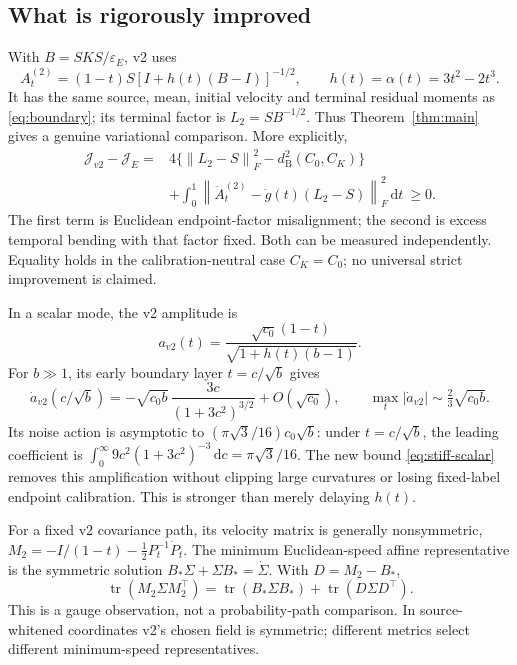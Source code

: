\documentclass[11pt,letterpaper]{article}
\newcommand{\epsE}{\varepsilon_E}
\newcommand{\tr}{\operatorname{tr}}
\newcommand{\dd}{\,\mathrm d}
\newcommand{\norm}[1]{\left\lVert#1\right\rVert}
\newcommand{\bures}{d_{\mathrm B}}
\newcommand{\J}{\mathcal J}
\begin{document}
\subsection{What is rigorously improved}
With $B=SKS/\epsE$, v2 uses
\begin{equation}
A_t^{(2)}=(1-t)S[I+h(t)(B-I)]^{-1/2},\qquad
h(t)=\alpha(t)=3t^2-2t^3.
\label{eq:v2}
\end{equation}
It has the same source, mean, initial velocity and terminal residual moments as \eqref{eq:boundary}; its terminal factor is $L_2=SB^{-1/2}$. Thus Theorem~\ref{thm:main} gives a genuine variational comparison. More explicitly,
\begin{equation}
\begin{split}
\J_{v2}-\J_E
={}&4\{\norm{L_2-S}_F^2-\bures^2(C_0,C_K)\}\\
&+\int_0^1\norm{\ddot A_t^{(2)}-\ddot g(t)(L_2-S)}_F^2\dd t\ \geq0.
\end{split}
\label{eq:v2-gap}
\end{equation}
The first term is Euclidean endpoint-factor misalignment; the second is excess temporal bending with that factor fixed. Both can be measured independently. Equality holds in the calibration-neutral case $C_K=C_0$; no universal strict improvement is claimed.

In a scalar mode, the v2 amplitude is
\begin{equation}
a_{v2}(t)=\frac{\sqrt{c_0}(1-t)}{\sqrt{1+h(t)(b-1)}}.
\end{equation}
For $b\gg1$, its early boundary layer $t=c/\sqrt b$ gives
\begin{equation}
\dot a_{v2}(c/\sqrt b)
=-\sqrt{c_0b}\,\frac{3c}{(1+3c^2)^{3/2}}+O(\sqrt{c_0}),\qquad
\max_t|\dot a_{v2}|\sim\tfrac23\sqrt{c_0b}.
\label{eq:v2-amplification}
\end{equation}
Its noise action is asymptotic to $(\pi\sqrt3/16)c_0\sqrt b$: under $t=c/\sqrt b$, the leading coefficient is $\int_0^\infty9c^2(1+3c^2)^{-3}\dd c=\pi\sqrt3/16$. The new bound \eqref{eq:stiff-scalar} removes this amplification without clipping large curvatures or losing fixed-label endpoint calibration. This is stronger than merely delaying $h(t)$.

For a fixed v2 covariance path, its velocity matrix is generally nonsymmetric,
$M_2=-I/(1-t)-\tfrac12P_t^{-1}\dot P_t$. The minimum Euclidean-speed affine representative is the symmetric solution $B_*\Sigma+\Sigma B_*=\dot\Sigma$. With $D=M_2-B_*$,
\begin{equation}
\tr(M_2\Sigma M_2^\top)=\tr(B_*\Sigma B_*)+\tr(D\Sigma D^\top).
\end{equation}
This is a gauge observation, not a probability-path comparison. In source-whitened coordinates v2's chosen field is symmetric; different metrics select different minimum-speed representatives.
\end{document}

